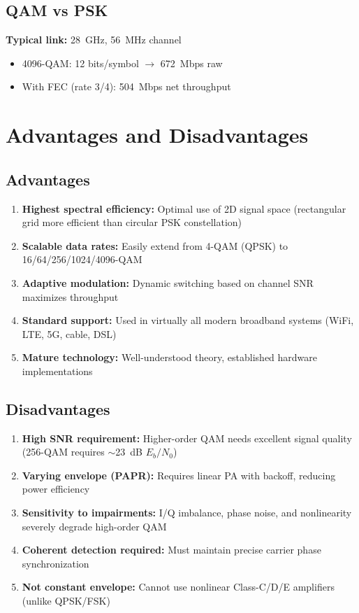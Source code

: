 \subsection{QAM vs PSK}

\textbf{Typical link:} 28~GHz, 56~MHz channel
\begin{itemize}
\item 4096-QAM: 12 bits/symbol $\rightarrow$ 672~Mbps raw
\item With FEC (rate 3/4): 504~Mbps net throughput
\end{itemize}

\section{Advantages and Disadvantages}

\subsection*{Advantages}

\begin{enumerate}
\item \textbf{Highest spectral efficiency:} Optimal use of 2D signal space (rectangular grid more efficient than circular PSK constellation)
\item \textbf{Scalable data rates:} Easily extend from 4-QAM (QPSK) to 16/64/256/1024/4096-QAM
\item \textbf{Adaptive modulation:} Dynamic switching based on channel SNR maximizes throughput
\item \textbf{Standard support:} Used in virtually all modern broadband systems (WiFi, LTE, 5G, cable, DSL)
\item \textbf{Mature technology:} Well-understood theory, established hardware implementations
\end{enumerate}

\subsection*{Disadvantages}

\begin{enumerate}
\item \textbf{High SNR requirement:} Higher-order QAM needs excellent signal quality (256-QAM requires $\sim$23~dB $E_b/N_0$)
\item \textbf{Varying envelope (PAPR):} Requires linear PA with backoff, reducing power efficiency
\item \textbf{Sensitivity to impairments:} I/Q imbalance, phase noise, and nonlinearity severely degrade high-order QAM
\item \textbf{Coherent detection required:} Must maintain precise carrier phase synchronization
\item \textbf{Not constant envelope:} Cannot use nonlinear Class-C/D/E amplifiers (unlike QPSK/FSK)
\end{enumerate}

